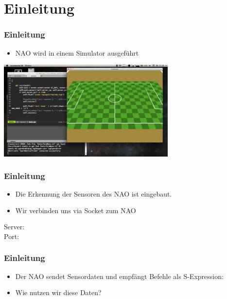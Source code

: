 \frame{\titlepage}

\section[Socket]{}
\frame{\tableofcontents}
\section{Einleitung}

\frame
{
  \frametitle{Einleitung}
  \begin{itemize}
    \item NAO wird in einem Simulator ausgef\"uhrt
  \end{itemize}
  \begin{center}\includegraphics[height=5cm, center]{simulator.pdf}\end{center}
}
  
\frame
{
  \frametitle{Einleitung}
  \begin{itemize}
    \item Die Erkennung der Sensoren des NAO ist eingebaut.
    \item Wir verbinden uns via Socket zum NAO
  \end{itemize}
  
  \begin{center}\tiny{Server: \\ Port: }\end{center}
}

\frame
{
  \frametitle{Einleitung}
  \begin{itemize}
    \item Der NAO sendet Sensordaten und empf\"angt Befehle als S-Expression:\\\vskip0.5cm
  \tiny{}\end{itemize}\begin{itemize}
    \item Wie nutzen wir diese Daten?
  \end{itemize}
}


